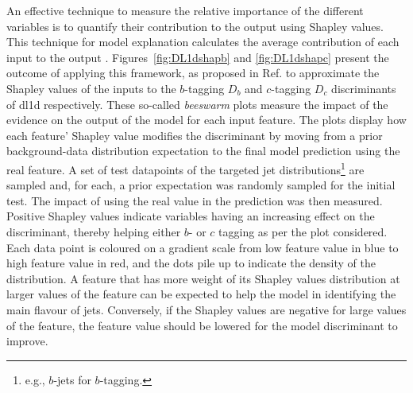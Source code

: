 An effective technique to measure the relative importance of the different variables is to quantify their contribution to the output using Shapley values. This technique for model explanation calculates the average contribution of each input to the output \cite{Rozemberczki2022TheSV}. Figures~\ref{fig:DL1dshapb} and \ref{fig:DL1dshapc} present the outcome of applying this framework, as proposed in Ref. \cite{NIPS2017_7062} to approximate the Shapley values of the inputs to the $b$-tagging $D_b$ and $c$-tagging $D_c$ discriminants of \gls{dl1d} respectively. These so-called \textit{beeswarm} plots measure the impact of the evidence on the output of the model for each input feature. The plots display how each feature' Shapley value modifies the discriminant by moving from a prior background-data distribution expectation to the final model prediction using the real feature. A set of test datapoints of the targeted jet distributions\footnote{e.g., $b$-jets for $b$-tagging.} are sampled and, for each, a prior expectation was randomly sampled for the initial test. The impact of using the real value in the prediction was then measured. Positive Shapley values indicate variables having an increasing effect on the discriminant, thereby helping either $b$- or $c$ tagging as per the plot considered. Each data point is coloured on a gradient scale from low feature value in blue to high feature value in red, and the dots pile up to indicate the density of the distribution. A feature that has more weight of its Shapley values distribution at larger values of the feature can be expected to help the model in identifying the main flavour of jets. Conversely, if the Shapley values are negative for large values of the feature, the feature value should be lowered for the model discriminant to improve.

